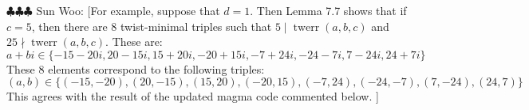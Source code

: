 \documentclass[12pt]{amsart}
\numberwithin{equation}{section} %
\theoremstyle{definition} \newtheorem{definition}[counter]{Definition}
\theoremstyle{remark} \newtheorem{nonexam}[counter]{Non-example}
\newcommand{\spark}[1]{{\color{olive} \sf
    $\clubsuit\clubsuit\clubsuit$ Sun Woo: [#1]}}
\DeclareMathOperator{\twerr}{twerr} %
\begin{document}
\spark{For example, suppose that $d=1$. Then Lemma 7.7 shows that if $c = 5$, then there are $8$ twist-minimal triples such that $5 \mid \twerr(a,b,c)$ and $25 \nmid \twerr(a,b,c)$. These are: 
\begin{equation*}
    a+bi \in \{-15-20i, 20-15i, 15 + 20i, -20+15i, -7 + 24i, -24-7i, 7 - 24i, 24 + 7i\}
\end{equation*}
These 8 elements correspond to the following triples:
\begin{equation*}
    (a,b) \in \{(-15,-20),(20,-15),(15,20),(-20,15),(-7,24),(-24,-7),(7,-24),(24,7)\}
\end{equation*}
This agrees with the result of the updated magma code commented below.
}


\end{document}
